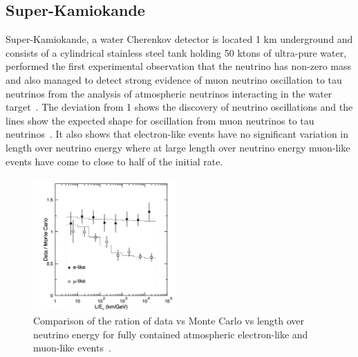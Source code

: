 \subsection{Super-Kamiokande}
Super-Kamiokande\cite{20SUPERK}, a water Cherenkov detector is located 1 km underground and consists of a cylindrical stainless steel tank holding 50 ktons of ultra-pure water, performed the first experimental observation that the neutrino has non-zero mass\cite{10Fukuda} and also managed to detect strong evidence of muon neutrino oscillation to tau neutrinos from the analysis of atmospheric neutrinos interacting in the water target~. The deviation from 1 shows the discovery of neutrino oscillations and the lines show the expected shape for oscillation from muon neutrinos to tau neutrinos~\cite{10Fukuda}. It also shows that electron-like events have no significant variation in length over neutrino energy where at large length over neutrino energy muon-like events have come to close to half of the initial rate.

\begin{figure}[h!]
\centering
  \centering
\includegraphics[width=0.49\textwidth]{figures/simuSK2.jpeg}
\vspace{2mm}
\caption{Comparison of the ration of data vs Monte Carlo vs length over neutrino energy for fully contained atmospheric electron-like and muon-like events~\cite{10Fukuda}.}
\label{fig:SK2}
\end{figure}

